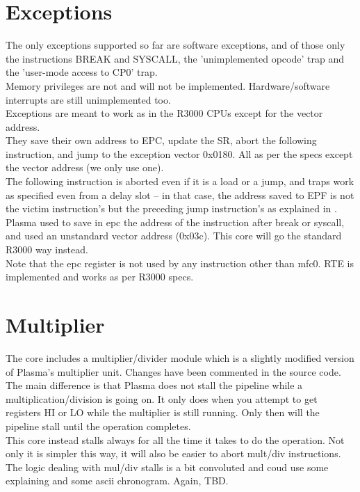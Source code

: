     
\section{Exceptions}
\label{exceptions}

    The only exceptions supported so far are software exceptions, and of those 
    only the instructions BREAK and SYSCALL, the 'unimplemented opcode' trap and
    the 'user-mode access to CP0' trap.\\
    Memory privileges are not and will not be implemented. Hardware/software 
    interrupts are still unimplemented too.\\
    
    Exceptions are meant to work as in the R3000 CPUs except for the vector 
    address.\\
    They save their own address to EPC, update the SR, abort the following 
    instruction, and jump to the exception vector 0x0180. All as per the specs 
    except the vector address (we only use one).\\
        
    The following instruction is aborted even if it is a load or a jump, and 
    traps work as specified even from a delay slot -- in that case, the address
    saved to EPF is not the victim instruction's but the preceding jump 
    instruction's as explained in \cite[p.~64]{see_mips_run}.\\
    
    Plasma used to save in epc the address of the instruction after break or 
    syscall, and used an unstandard vector address (0x03c). This core will go 
    the standard R3000 way instead.\\
    
    Note that the epc register is not used by any instruction other than mfc0.
    RTE is implemented and works as per R3000 specs.\\


\section{Multiplier}
\label{multiplier}

    The core includes a multiplier/divider module which is a slightly modified 
    version of Plasma's multiplier unit. Changes have been commented in the 
    source code.\\
    
    The main difference is that Plasma does not stall the pipeline while a 
    multiplication/division is going on. It only does when you attempt to get 
    registers HI or LO while the multiplier is still running. Only then will
    the pipeline stall until the operation completes.\\
    This core instead stalls always for all the time it takes to do the 
    operation. Not only it is simpler this way, it will also be easier to 
    abort mult/div instructions.\\
    
    The logic dealing with mul/div stalls is a bit convoluted and coud use some
    explaining and some ascii chronogram. Again, TBD.\\